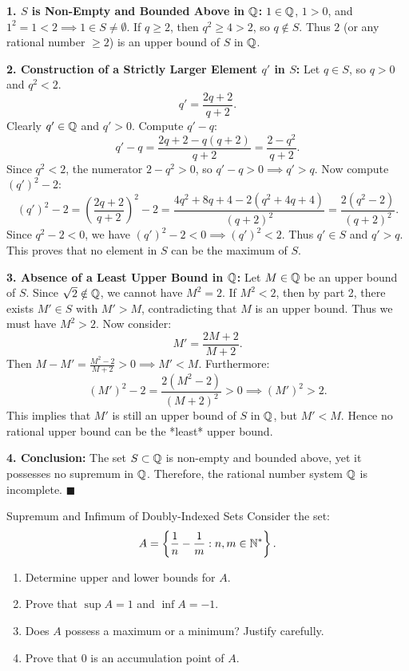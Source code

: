 \begin{solution}
\textbf{1. $S$ is Non-Empty and Bounded Above in $\mathbb{Q}$:}
$1 \in \mathbb{Q}$, $1 > 0$, and $1^2 = 1 < 2 \implies 1 \in S \ne \emptyset$.
If $q \ge 2$, then $q^2 \ge 4 > 2$, so $q \notin S$.
Thus $2$ (or any rational number $\ge 2$) is an upper bound of $S$ in $\mathbb{Q}$.

\textbf{2. Construction of a Strictly Larger Element $q'$ in $S$:}
Let $q \in S$, so $q > 0$ and $q^2 < 2$.
\[
q' = \frac{2q + 2}{q + 2}.
\]
Clearly $q' \in \mathbb{Q}$ and $q' > 0$.
Compute $q' - q$:
\[
q' - q = \frac{2q + 2 - q(q + 2)}{q + 2} = \frac{2 - q^2}{q + 2}.
\]
Since $q^2 < 2$, the numerator $2 - q^2 > 0$, so $q' - q > 0 \implies q' > q$.
Now compute $(q')^2 - 2$:
\[
(q')^2 - 2 = \left(\frac{2q + 2}{q + 2}\right)^2 - 2 = \frac{4q^2 + 8q + 4 - 2(q^2 + 4q + 4)}{(q + 2)^2} = \frac{2(q^2 - 2)}{(q + 2)^2}.
\]
Since $q^2 - 2 < 0$, we have $(q')^2 - 2 < 0 \implies (q')^2 < 2$.
Thus $q' \in S$ and $q' > q$.
This proves that no element in $S$ can be the maximum of $S$.

\textbf{3. Absence of a Least Upper Bound in $\mathbb{Q}$:}
Let $M \in \mathbb{Q}$ be an upper bound of $S$.
Since $\sqrt{2} \notin \mathbb{Q}$, we cannot have $M^2 = 2$.
If $M^2 < 2$, then by part 2, there exists $M' \in S$ with $M' > M$, contradicting that $M$ is an upper bound.
Thus we must have $M^2 > 2$.
Now consider:
\[
M' = \frac{2M + 2}{M + 2}.
\]
Then $M - M' = \frac{M^2 - 2}{M + 2} > 0 \implies M' < M$.
Furthermore:
\[
(M')^2 - 2 = \frac{2(M^2 - 2)}{(M + 2)^2} > 0 \implies (M')^2 > 2.
\]
This implies that $M'$ is still an upper bound of $S$ in $\mathbb{Q}$, but $M' < M$.
Hence no rational upper bound can be the *least* upper bound.

\textbf{4. Conclusion:}
The set $S \subset \mathbb{Q}$ is non-empty and bounded above, yet it possesses no supremum in $\mathbb{Q}$.
Therefore, the rational number system $\mathbb{Q}$ is incomplete. \hfill $\blacksquare$
\end{solution}

\begin{exercise}{Supremum and Infimum of Doubly-Indexed Sets}
Consider the set:
\[
A = \left\{ \frac{1}{n} - \frac{1}{m} : n, m \in \mathbb{N}^* \right\}.
\]
\begin{enumerate}[leftmargin=1.5em,itemsep=2pt]
  \item Determine upper and lower bounds for $A$.
  \item Prove that $\sup A = 1$ and $\inf A = -1$.
  \item Does $A$ possess a maximum or a minimum? Justify carefully.
  \item Prove that $0$ is an accumulation point of $A$.
\end{enumerate}
\end{exercise}

